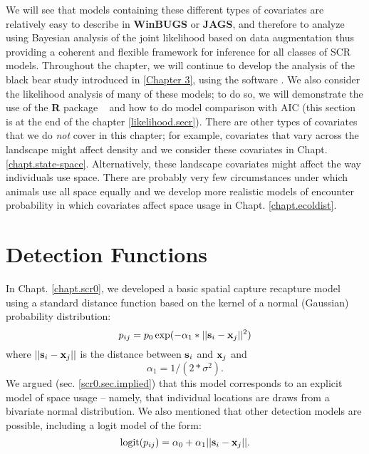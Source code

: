 We will see that models containing these different types of
covariates are relatively easy to describe in {\bf WinBUGS} or
{\bf JAGS}, and
therefore to analyze using Bayesian analysis of the joint likelihood
based on data augmentation thus providing a coherent and flexible
framework for inference for all classes of SCR models.  Throughout the
chapter, we will continue to develop the analysis of the black bear
study introduced in \ref{Chapter 3}, using the software
\jags.  We also
consider the likelihood analysis of many of these models; to do so, we
will demonstrate the use of the {\bf R} package \secr~ and how to do model
comparison with AIC (this section is at the end of the chapter \ref{likelihood.secr}).
There are other types of covariates that we do {\it not} cover in this
chapter; for example, covariates that vary across the
landscape might affect density and we consider these covariates in
Chapt. \ref{chapt.state-space}.
Alternatively, these landscape covariates might affect the way individuals use
space. There are probably very few circumstances under which animals use all 
space equally and we develop more realistic models of encounter
probability in which covariates affect space usage in Chapt. \ref{chapt.ecoldist}.


\section{Detection Functions}

In Chapt. \ref{chapt.scr0}, we developed a basic spatial capture
recapture model using a standard distance function based on the kernel
of a normal (Gaussian) probability distribution:
\[
p_{ij} = p_{0} \exp(-\alpha_{1} *||{\bf s}_{i}-{\bf x}_{j}||^2)
\]
where $||{\bf s}_{i}-{\bf x}_{j}||$ is the distance between ${\bf
  s}_{i}$ and ${\bf x}_{j}$ and
\[
\alpha_{1} = 1/(2*\sigma^2).
\]
We argued (sec. \ref{scr0.sec.implied}) that this model corresponds to
an explicit model of space usage -- namely, that individual locations
are draws from a bivariate normal distribution. We also mentioned that
other detection models are possible, including a logit model of the
form:
\begin{equation}
	\mbox{logit}(p_{ij}) = \alpha_{0} + \alpha_1 ||{\bf s}_{i}-{\bf x}_{j} ||.
\label{covariates.eq.logit}
\end{equation}

